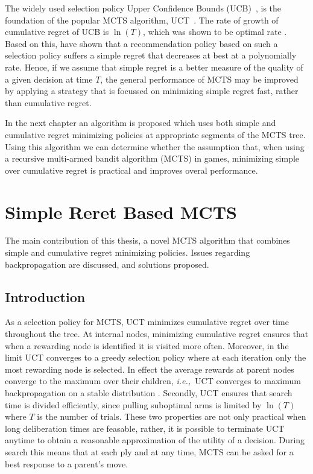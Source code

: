 \documentclass{kecsmstr}
\newcommand{\ie}{{\it i.e.,}~}
\begin{document}
The widely used selection policy Upper Confidence Bounds (UCB)~, is the foundation of the popular MCTS algorithm, UCT~. The rate of growth of cumulative regret of UCB is $\ln(T)$, which was shown to be optimal rate . Based on this,  have shown that a recommendation policy based on such a selection policy suffers a simple regret that decreases at best at a polynomially rate. Hence, if we assume that simple regret is a better measure of the quality of a given decision at time $T$, the general performance of MCTS may be improved by applying a strategy that is focussed on minimizing simple regret fast, rather than cumulative regret.

In the next chapter an algorithm is proposed which uses both simple and cumulative regret minimizing policies at appropriate segments of the MCTS tree. Using this algorithm we can determine whether the assumption that, when using a recursive multi-armed bandit algorithm (MCTS) in games, minimizing simple over cumulative regret is practical and improves overal performance.

\chapter{Simple Reret Based MCTS}
\label{chap:mctssr}
\begin{chaptercontents} The main contribution of this thesis, a novel MCTS algorithm that combines simple and cumulative regret minimizing policies. Issues regarding backpropagation are discussed, and solutions proposed.
\end{chaptercontents}
\section{Introduction}
As a selection policy for MCTS, UCT minimizes cumulative regret over time throughout the tree. At internal nodes, minimizing cumulative regret ensures that  when a rewarding node is identified it is visited more often. Moreover, in the limit UCT converges to a greedy selection policy where at each iteration only the most rewarding node is selected. In effect the average rewards at parent nodes converge to the maximum over their children, \ie UCT converges to maximum backpropagation on a stable distribution . Secondly, UCT ensures that search time is divided efficiently, since pulling suboptimal arms is limited by $\ln(T)$ where $T$ is the number of trials. These two properties are not only practical when long deliberation times are feasable, rather, it is possible to terminate UCT anytime to obtain a reasonable approximation of the utility of a decision. During search this means that at each ply and at any time, MCTS can be asked for a best response to a parent's move.
\end{document}
